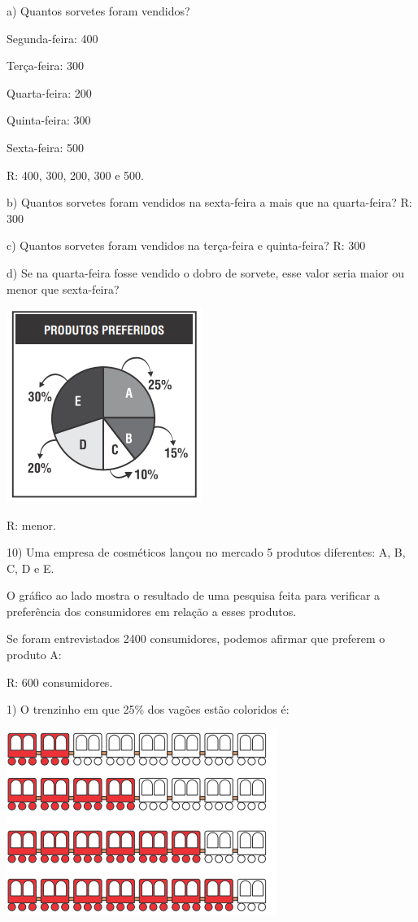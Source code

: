a) Quantos sorvetes foram vendidos?

Segunda-feira: 400

Terça-feira: 300

Quarta-feira: 200

Quinta-feira: 300

Sexta-feira: 500

R: 400, 300, 200, 300 e 500.

b) Quantos sorvetes foram vendidos na sexta-feira a mais que na
quarta-feira? R: 300

c) Quantos sorvetes foram vendidos na terça-feira e quinta-feira? R: 300

d) Se na quarta-feira fosse vendido o dobro de sorvete, esse valor seria
maior ou menor que sexta-feira?

\includegraphics[width=2.51181in,height=2.47708in]{./imgSAEB_6_MAT/media/image88.png}

R: menor.

10) Uma empresa de cosméticos lançou no mercado 5 produtos diferentes:
A, B, C, D e E.

O gráfico ao lado mostra o resultado de uma pesquisa feita para
verificar a preferência dos consumidores em relação a esses produtos.

Se foram entrevistados 2400 consumidores, podemos afirmar que preferem o
produto A:

R: 600 consumidores.


1) O trenzinho em que 25\% dos vagões estão coloridos é:

\includegraphics[width=3.46528in,height=2.38403in]{./imgSAEB_6_MAT/media/image89.png}


